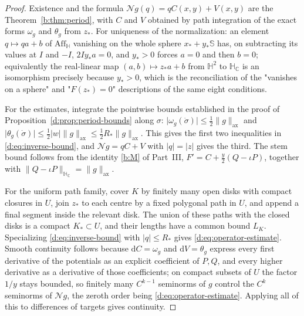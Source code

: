 \documentclass[11pt,a4paper]{article}
\numberwithin{equation}{section}
\theoremstyle{definition}
\theoremstyle{remark}
\theoremstyle{plain}
\newcommand{\HH}{\mathbb H}
\newcommand{\HC}{\mathbb H_{\mathbb C}}
\newcommand{\SSS}{\mathbb S}
\newcommand{\Aff}{\mathrm{Aff}_{\HH}}
\newcommand{\om}{\omega}
\newcommand{\thet}{\theta}
\newcommand{\pot}{C}          %
\newcommand{\potV}{V}         %
\newcommand{\axn}[1]{\lVert #1\rVert_{\mathrm{ax}}}   %
\newcommand{\abs}[1]{\lvert #1\rvert}
\newcommand{\norm}[1]{\lVert #1\rVert}
\newcommand{\dd}{\mathrm d}
\begin{document}
\begin{proof}
Existence and the formula $\mathcal Ng(q)=q\pot(x,y)+\potV(x,y)$ are the
Theorem~\ref{b:thm:period}, with $\pot$ and $\potV$ obtained by
path integration of the exact forms $\om_g$ and $\thet_g$ from $z_*$.  For
uniqueness of the normalization: an element $q\mapsto qa+b$ of $\Aff$
vanishing on the whole sphere $x_*+y_*\SSS$ has, on subtracting its values
at $I$ and $-I$, $2Iy_*a=0$, and $y_*>0$ forces $a=0$ and then $b=0$;
equivalently the real-linear map $(a,b)\mapsto z_*a+b$ from $\HH^2$ to
$\HC$ is an isomorphism precisely because $y_*>0$, which is the
reconciliation of the "vanishes on a sphere" and "$F(z_*)=0$" descriptions
of the same eight conditions.

For the estimates, integrate the pointwise bounds established in the proof
of Proposition~\ref{d:prop:period-bounds} along $\sigma$:
$\abs{\om_g(\dot\sigma)}\le\tfrac12\axn g$ and
$\abs{\thet_g(\dot\sigma)}\le\tfrac12\abs w\axn g\le\tfrac12R_*\axn g$.
This gives the first two inequalities in \eqref{d:eq:inverse-bound}, and
$\mathcal Ng=q\pot+\potV$ with $\abs q=\abs z$ gives the third.  The stem
bound follows from the identity \eqref{b:M} of Part~III,
$F'=\pot+\tfrac y2(Q-\iota P)$, together with
$\norm{Q-\iota P}_{\HC}=\axn g$.

For the uniform path family, cover $K$ by finitely many open disks with
compact closures in $U$, join $z_*$ to each centre by a fixed polygonal
path in $U$, and append a final segment inside the relevant disk.  The
union of these paths with the closed disks is a compact $K_*\subset U$, and
their lengths have a common bound $L_K$.  Specializing
\eqref{d:eq:inverse-bound} with $\abs q\le R_*$ gives
\eqref{d:eq:operator-estimate}.  Smooth continuity follows because
$\dd\pot=\om_g$ and $\dd\potV=\thet_g$ express every first derivative of
the potentials as an explicit coefficient of $P,Q$, and every higher
derivative as a derivative of those coefficients; on compact subsets of $U$
the factor $1/y$ stays bounded, so finitely many $C^{k-1}$ seminorms of $g$
control the $C^k$ seminorms of $\mathcal Ng$, the zeroth order being
\eqref{d:eq:operator-estimate}.  Applying all of this to differences of
targets gives continuity.
\end{proof}
\end{document}

